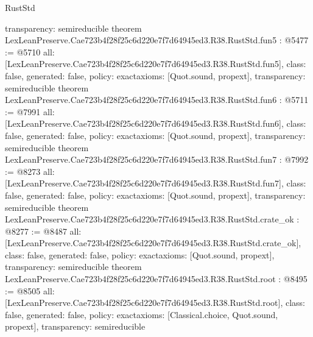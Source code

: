 \begin{lexlean}{RustStd}
\begin{coremodule}
{  transparency: semireducible
}
theorem LexLeanPreserve.Cae723b4f28f25c6d220e7f7d64945ed3.R38.RustStd.fun5 : @5477 := @5710 {
  all: [LexLeanPreserve.Cae723b4f28f25c6d220e7f7d64945ed3.R38.RustStd.fun5],
  class: false,
  generated: false,
  policy: exact{axioms: [Quot.sound, propext]},
  transparency: semireducible
}
theorem LexLeanPreserve.Cae723b4f28f25c6d220e7f7d64945ed3.R38.RustStd.fun6 : @5711 := @7991 {
  all: [LexLeanPreserve.Cae723b4f28f25c6d220e7f7d64945ed3.R38.RustStd.fun6],
  class: false,
  generated: false,
  policy: exact{axioms: [Quot.sound, propext]},
  transparency: semireducible
}
theorem LexLeanPreserve.Cae723b4f28f25c6d220e7f7d64945ed3.R38.RustStd.fun7 : @7992 := @8273 {
  all: [LexLeanPreserve.Cae723b4f28f25c6d220e7f7d64945ed3.R38.RustStd.fun7],
  class: false,
  generated: false,
  policy: exact{axioms: [Quot.sound, propext]},
  transparency: semireducible
}
theorem LexLeanPreserve.Cae723b4f28f25c6d220e7f7d64945ed3.R38.RustStd.crate_ok : @8277 := @8487 {
  all: [LexLeanPreserve.Cae723b4f28f25c6d220e7f7d64945ed3.R38.RustStd.crate_ok],
  class: false,
  generated: false,
  policy: exact{axioms: [Quot.sound, propext]},
  transparency: semireducible
}
theorem LexLeanPreserve.Cae723b4f28f25c6d220e7f7d64945ed3.R38.RustStd.root : @8495 := @8505 {
  all: [LexLeanPreserve.Cae723b4f28f25c6d220e7f7d64945ed3.R38.RustStd.root],
  class: false,
  generated: false,
  policy: exact{axioms: [Classical.choice, Quot.sound, propext]},
  transparency: semireducible
}


\end{coremodule}
\end{lexlean}
